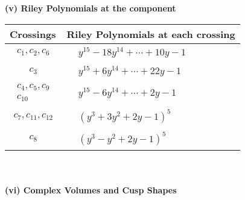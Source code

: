 \documentclass[1p]{elsarticle_modified}
\theoremstyle{definition}
\begin{document}
\newpage\renewcommand{\arraystretch}{1}
\flushleft \textbf{(v) Riley Polynomials at the component}\newline \\
\begin{tabular}{m{50pt}|m{274pt}}
Crossings & \hspace{64pt}Riley Polynomials at each crossing \\
\hline $$\begin{aligned}c_{1},c_{2},c_{6}\end{aligned}$$&$\begin{aligned}
&y^{15}-18 y^{14}+\cdots+10 y-1
\end{aligned}$\\
\hline $$\begin{aligned}c_{3}\end{aligned}$$&$\begin{aligned}
&y^{15}+6 y^{14}+\cdots+22 y-1
\end{aligned}$\\
\hline $$\begin{aligned}c_{4},c_{5},c_{9}\\c_{10}\end{aligned}$$&$\begin{aligned}
&y^{15}-6 y^{14}+\cdots+2 y-1
\end{aligned}$\\
\hline $$\begin{aligned}c_{7},c_{11},c_{12}\end{aligned}$$&$\begin{aligned}
&(y^3+3 y^2+2 y-1)^5
\end{aligned}$\\
\hline $$\begin{aligned}c_{8}\end{aligned}$$&$\begin{aligned}
&(y^3- y^2+2 y-1)^5
\end{aligned}$\\
\hline
\end{tabular}\\~\\
\newpage\flushleft \textbf{(vi) Complex Volumes and Cusp Shapes}
\end{document}
